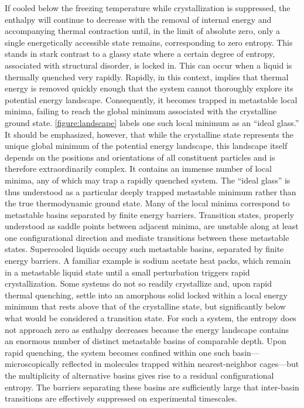 If cooled below the freezing temperature while crystallization is suppressed, the enthalpy will continue to decrease with the removal of internal energy and accompanying thermal contraction until, in the limit of absolute zero, only a single energetically accessible state remains, corresponding to zero entropy.  This stands in stark contrast to a glassy state where a certain degree of entropy, associated with structural disorder, is locked in.  This can occur when a liquid is thermally quenched very rapidly.  Rapidly, in this context, implies that thermal energy is removed quickly enough that the system cannot thoroughly explore its potential energy landscape. Consequently, it becomes trapped in metastable local minima, failing to reach the global minimum associated with the crystalline ground state.  \fig \nolinebreak \ref{figure:landscape} labels one such local minimum as an ``ideal glass.'' It should be emphasized, however, that while the crystalline state represents the unique global minimum of the potential energy landscape, this landscape itself depends on the positions and orientations of all constituent particles and is therefore extraordinarily complex. It contains an immense number of local minima, any of which may trap a rapidly quenched system. The ``ideal glass'' is thus understood as a particular deeply trapped metastable minimum rather than the true thermodynamic ground state. Many of the local minima correspond to metastable basins separated by finite energy barriers. Transition states, properly understood as saddle points between adjacent minima, are unstable along at least one configurational direction and mediate transitions between these metastable states. Supercooled liquids occupy such metastable basins, separated by finite energy barriers. A familiar example is sodium acetate heat packs, which remain in a metastable liquid state until a small perturbation triggers rapid crystallization. Some systems do not so readily crystallize and, upon rapid thermal quenching, settle into an amorphous solid locked within a local energy minimum that rests above that of the crystalline state, but significantly below what would be considered a transition state. For such a system, the entropy does not approach zero as enthalpy decreases because the energy landscape contains an enormous number of distinct metastable basins of comparable depth. Upon rapid quenching, the system becomes confined within one such basin—microscopically reflected in molecules trapped within nearest-neighbor cages—but the multiplicity of alternative basins gives rise to a residual configurational entropy. The barriers separating these basins are sufficiently large that inter-basin transitions are effectively suppressed on experimental timescales.

